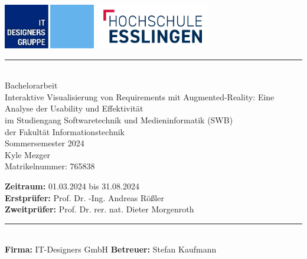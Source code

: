 \newcommand{\HRule}[2]{\noindent\rule[#1]{\linewidth}{#2}} %
\newcommand{\vlinespace}[1]{\vspace*{#1\baselineskip}} %
\newcommand{\titleemph}[1]{\textbf{#1}} %

\begin{titlepage}
 \sffamily %
      \includegraphics[width=4cm]{images/it-d_logo.png}
      \hfill \includegraphics[width=5cm]{images/hslogo_small.png}
      \HRule{13pt}{1pt} 
   \centering
      \Large
      \vlinespace{3}\\
      Bachelorarbeit\\
      \huge
      Interaktive Visualisierung von Requirements mit Augmented-Reality: Eine Analyse der Usability und Effektivität\\
%
      \Large
      \vlinespace{2}
          im Studiengang Softwaretechnik und Medieninformatik (SWB)\\
          der Fakultät Informationstechnik\\
%      
      Sommersemester 2024\\
%     
      \vlinespace{2}
      Kyle Mezger\\
      Matrikelnummer: 765838
%
   \vfill
   \raggedright
%   
   \large
  \titleemph{Zeitraum:} 01.03.2024 bis 31.08.2024 \\ %
   \titleemph{Erstprüfer:} Prof. Dr. -Ing. Andreas Rößler \\
   \titleemph{Zweitprüfer:} Prof. Dr. rer. nat. Dieter Morgenroth \\

   \vlinespace{1}
   \HRule{13pt}{1pt} \\
   \titleemph{Firma:} IT-Designers GmbH 
   \hfill \titleemph{Betreuer:} Stefan Kaufmann

\end{titlepage}
